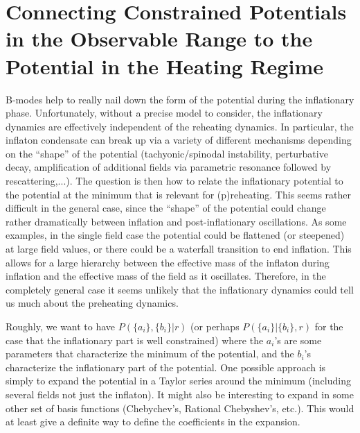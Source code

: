 \documentclass[11pt]{article}
\begin{document}
\section{Connecting Constrained Potentials in the Observable Range to the Potential in the Heating Regime }

B-modes help to really nail down the form of the potential during the
inflationary phase.  
Unfortunately, without a precise model to consider, the inflationary
dynamics are effectively independent of the reheating dynamics.
In particular, the inflaton condensate can break up via a variety of
different mechanisms depending on the ``shape'' of the potential
(tachyonic/spinodal instability, perturbative decay, amplification of
additional fields via parametric resonance followed by rescattering,...). 
The question is then how to relate the inflationary potential to the
potential at the minimum that is relevant for (p)reheating.
This seems rather difficult in the general case, since the ``shape'' of the
potential could change rather dramatically between inflation and
post-inflationary oscillations.  As some examples, in the single field case
the potential could be flattened (or steepened) at large field values, or
there could be a waterfall transition to end inflation.  This allows for a
large hierarchy between the effective mass of the inflaton during inflation
and the effective mass of the field as it oscillates.  Therefore, in the
completely general case it seems unlikely that the inflationary dynamics
could tell us much about the preheating dynamics.

Roughly, we want to have $P(\{a_i\},\{b_i\}|r)$ (or perhaps
$P(\{a_i\}|\{b_i\},r)$ for the case that the inflationary part is well
constrained)
where the $a_i$'s are some parameters that characterize the minimum of the
potential, and the $b_i$'s characterize the inflationary part of the
potential.
One possible approach is simply to expand the potential in a Taylor series
around the minimum (including several fields not just the inflaton).
It might also be interesting to expand in some other set of basis functions
(Chebychev's, Rational Chebyshev's, etc.).
This would at least give a definite way to define the coefficients in the
expansion.
\end{document}
